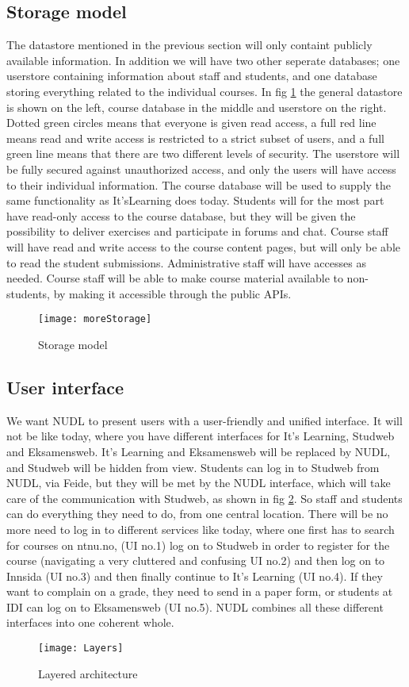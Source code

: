 	\subsection{Storage model}
		The datastore mentioned in the previous section will only containt publicly available information. In addition we will have two other seperate databases; one userstore containing information about staff and students, and one database storing everything related to the individual courses. In fig \ref{fig:storagemodel} the general datastore is shown on the left, course database in the middle and userstore on the right. Dotted green circles means that everyone is given read access, a full red line means read and write access is restricted to a strict subset of users, and a full green line means that there are two different levels of security. The userstore will be fully secured against unauthorized access, and only the users will have access to their individual information. The course database will be used to supply the same functionality as It'sLearning does today. Students will for the most part have read-only access to the course database, but they will be given the possibility to deliver exercises and participate in forums and chat. Course staff will have read and write access to the course content pages, but will only be able to read the student submissions. Administrative staff will have accesses as needed. 
Course staff will be able to make course material available to non-students, by making it accessible through the public APIs. 
\begin{figure}
\centering
\texttt{[image: moreStorage]}
\caption{Storage model}
\label{fig:storagemodel}
\end{figure}

		
	\subsection{User interface} 
		We want NUDL to present users with a user-friendly and unified interface. It will not be like today, where you have different interfaces for It's Learning, Studweb and Eksamensweb. It's Learning and Eksamensweb will be replaced by NUDL, and Studweb will be hidden from view. Students can log in to Studweb from NUDL, via Feide, but they will be met by the NUDL interface, which will take care of the communication with Studweb, as shown in fig \ref{fig:layers}. So staff and students can do everything they need to do, from one central location. There will be no more need to log in to different services like today, where one first has to search for courses on ntnu.no, (UI no.1) log on to Studweb in order to register for the course (navigating a very cluttered and confusing UI no.2) and then log on to Innsida (UI no.3) and then finally continue to It's Learning (UI no.4). If they want to complain on a grade, they need to send in a paper form, or students at IDI can log on to Eksamensweb (UI no.5). NUDL combines all these different interfaces into one coherent whole. 
\begin{figure}
\centering
\texttt{[image: Layers]}
\caption{Layered architecture}
\label{fig:layers}
\end{figure}
